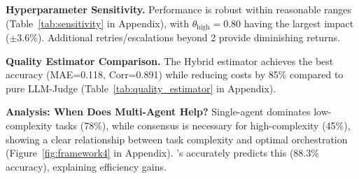 \documentclass{article}
\theoremstyle{plain}
\theoremstyle{definition}
\theoremstyle{remark}
\begin{document}

\textbf{Hyperparameter Sensitivity.}
Performance is robust within reasonable ranges (Table~\ref{tab:sensitivity} in Appendix), with $\theta_{\text{high}}=0.80$ having the largest impact ($\pm$3.6\%). Additional retries/escalations beyond 2 provide diminishing returns.

\textbf{Quality Estimator Comparison.}
The Hybrid estimator achieves the best accuracy (MAE=0.118, Corr=0.891) while reducing costs by 85\% compared to pure LLM-Judge (Table~\ref{tab:quality_estimator} in Appendix).

\textbf{Analysis: When Does Multi-Agent Help?}
Single-agent dominates low-complexity tasks (78\%), while consensus is necessary for high-complexity (45\%), showing a clear relationship between task complexity and optimal orchestration (Figure~\ref{fig:framework4} in Appendix). \amore{}'s \car{} accurately predicts this (88.3\% accuracy), explaining efficiency gains.
\end{document}
